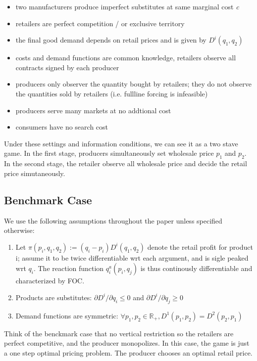 \documentclass{book}
\theoremstyle{plain}
\theoremstyle{definition}
\newcommand{\R}{\mathbb{R}}			%
\begin{document}
\begin{itemize}
	\item two manufacturers produce imperfect substitutes at same marginal cost \textit{c}
	\item retailers are perfect competition / or exclusive territory
	\item the final good demand depends on retail prices and is given by $D^i(q_1,q_2)$
	\item costs and demand functions are common knowledge, retailers observe all contracts signed by each producer
	\item producers only observer the quantity bought by retailers; they do not observe the quantities sold by retailers (i.e. fullline forcing is infeasible)
	\item producers serve many markets at no addtional cost
	\item consumers have no search cost
\end{itemize}

Under these settings and information conditions, we can see it as a two stave game. In the first stage, producers simultaneously set wholesale price $p_1$ and $p_2$. In the second stage, the retailer observe all wholesale price and decide the retail price simutaneously.

\subsection{Benchmark Case} %
\label{sub:benchmark}

We use the following assumptions throughout the paper unless specified otherwise:

\begin{enumerate}
	\item Let $\pi(p_i,q_1,q_2) := (q_i-p_i)D^i(q_1,q_2)$ denote the retail profit for product i; assume it to be twice differentiable wrt each argument, and is sigle peaked wrt $q_i$. The reaction function $q_i^a(p_i,q_j)$ is thus continously differentiable and characterized by FOC.
	\item Products are substitutes: $\partial D^i/\partial q_i \leq 0$ and $\partial D^i/\partial q_j \geq 0$
	\item Demand functions are symmetric: $\forall p_1,p_2 \in \R_+, D^1(p_1,p_2) = D^2(p_2,p_1)$
\end{enumerate}

Think of the benckmark case that no vertical restriction so the retailers are perfect competitive, and the producer monopolizes. In this case, the game is just a one step optimal pricing problem. The producer chooses an optimal retail price.\\
\end{document}
